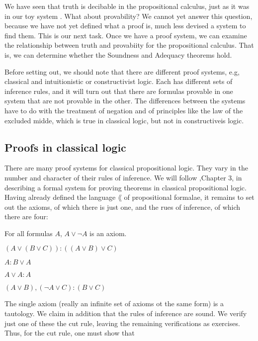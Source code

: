 We have seen that truth is decibable in the propositional calculus, just as it was in our toy system .  What about provability?  We cannot yet answer this question, because we have not yet defined what a proof is, much less devised a system to find them.  This is our next task.  Once we have a proof system, we can examine the relationship between truth and provabiity for the propositional calculus.  That is, we can determine whether the Soundness and Adequacy theorems hold.


Before setting out, we should note that there are different proof systems, e.g,  classical and intuitionistic or constructivist logic.  Each has different sets of inference rules, and it will turn out that there are formulas provable in one system that are not provable in the other.  The differences between the systems have to do with the treatment of negation and of principles like the law of the excluded midde, which is true in classical logic, but not in constructiveis logic.

\subsection{Proofs in classical logic}


There are many proof systems for classical propositional logic.  They vary in the number and character of their rules of inference.  We will follow  \cite{RH},Chapter 3, in describing a formal system  for proving theorems in classical propositional logic. Having already defined the language $\lang$ of propositional formalae, it remains to set out the axioms, of which there is just one, and the rues of inference, of which there are four:

 For all formulas $A$, $A \lor \neg A$ is an axiom.



 $(A \lor (B \lor C)) : ((A \lor B) \lor C)$

 $A : B \lor A$

 $A \lor A : A$

 $(A \lor B), (\neg A \lor C) : (B \lor C) $

The single axiom (really an infinite set of axioms ot the same form) is a tautology. We claim in addition that the rules of inference are sound.  We  verify just one of these the cut rule, leaving the remaining verifications as exercises.  Thus, for the cut rule, one must show that

